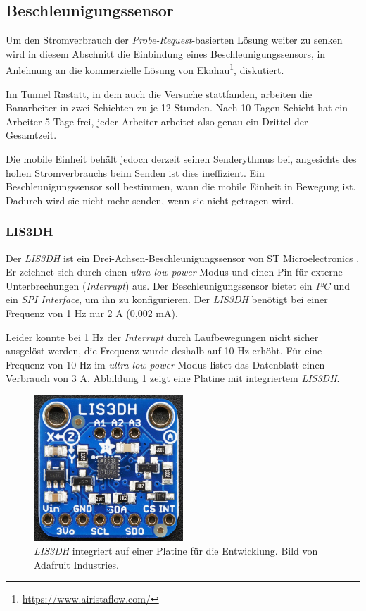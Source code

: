 \subsection{Beschleunigungssensor}
\label{ch:Beschleunigungssensor}
Um den Stromverbrauch der \emph{Probe-Request}-basierten Lösung weiter zu senken wird in diesem Abschnitt die Einbindung eines Beschleunigungssensors, in Anlehnung an die kommerzielle Lösung von Ekahau\footnote{\url{https://www.airistaflow.com/}}, diskutiert. 

Im Tunnel Rastatt, in dem auch die Versuche stattfanden, arbeiten die Bauarbeiter in zwei Schichten zu je 12 Stunden. 
Nach 10 Tagen Schicht hat ein Arbeiter 5 Tage frei, jeder Arbeiter arbeitet also genau ein Drittel der Gesamtzeit. 

Die mobile Einheit behält jedoch derzeit seinen Senderythmus bei, angesichts des hohen Stromverbrauchs beim Senden ist dies ineffizient.
Ein Beschleunigungssensor soll bestimmen, wann die mobile Einheit in Bewegung ist. 
Dadurch wird sie nicht mehr senden, wenn sie nicht getragen wird.

\subsubsection{LIS3DH}
Der \emph{LIS3DH} ist ein Drei-Achsen-Beschleunigungssensor von ST Microelectronics \cite{st2015lis}.
Er zeichnet sich durch einen \emph{ultra-low-power} Modus und einen Pin für externe Unterbrechungen (\emph{Interrupt}) aus.
Der Beschleunigungssensor bietet ein \emph{I²C} und ein \emph{SPI Interface}, um ihn zu konfigurieren.
Der \emph{LIS3DH} benötigt bei einer Frequenz von 1 Hz nur 2 \textmu A (0,002 mA).

Leider konnte bei 1 Hz der \emph{Interrupt} durch Laufbewegungen nicht sicher ausgelöst werden, die Frequenz wurde deshalb auf 10 Hz erhöht.
Für eine Frequenz von 10 Hz im \emph{ultra-low-power} Modus listet das Datenblatt einen Verbrauch von 3 \textmu A.
Abbildung \ref{fig:lis3dh} zeigt eine Platine mit integriertem \emph{LIS3DH}.

\begin{figure}[h]
  \centering
	\includegraphics[width=0.5\textwidth]{images/lis3dhada.png}
  \caption{\emph{LIS3DH} integriert auf einer Platine für die Entwicklung. Bild von Adafruit Industries\protect \footnotemark.}
  \label{fig:lis3dh}
\end{figure}

